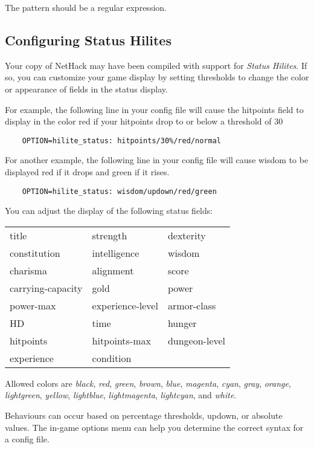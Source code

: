 The pattern should be a regular expression.

\subsection*{Configuring Status Hilites}

Your copy of NetHack may have been compiled with support for {\it Status Hilites}.
If so, you can customize your game display by setting thresholds to 
change the color or appearance of fields in the status display.

For example, the following line in your config file will cause
the hitpoints field to display in the color red if your hitpoints
drop to or below a threshold of 30%
\begin{verbatim}
    OPTION=hilite_status: hitpoints/30%/red/normal
\end{verbatim}
For another example, the following line in your config file will cause
wisdom to be displayed red if it drops and green if it rises.
\begin{verbatim}
    OPTION=hilite_status: wisdom/updown/red/green
\end{verbatim}
You can adjust the display of the following status fields:
\begin{center}
\begin{tabular}{lll}
title & strength & dexterity\\
constitution & intelligence & wisdom\\
charisma & alignment & score\\
carrying-capacity & gold & power\\
power-max & experience-level & armor-class\\
HD & time & hunger\\
hitpoints & hitpoints-max & dungeon-level\\
experience & condition\\
\end{tabular}
\end{center}

Allowed colors are {\it black}, {\it red}, {\it green}, {\it brown},
{\it blue}, {\it magenta}, {\it cyan}, {\it gray}, {\it orange},
{\it lightgreen}, {\it yellow}, {\it lightblue}, {\it lightmagenta},
{\it lightcyan}, and {\it white}.

Behaviours can occur based on percentage thresholds, updown, or absolute values.
The in-game options menu can help you determine the correct syntax for a 
config file.

